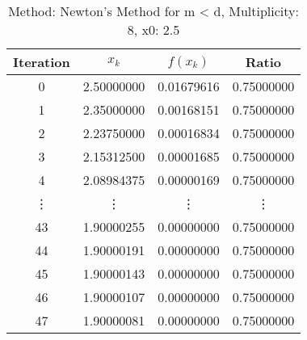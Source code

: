 \begin{table}
\centering
\caption{Method: Newton's Method for m < d, Multiplicity: 8, x0: 2.5}
\label{tab:table_Newton's_Method_for_m_<_d_8_2_5}
\begin{tabular}{c c c c}
\toprule
Iteration &      $x_k$ &   $f(x_k)$ &      Ratio \\
\midrule
        0 & 2.50000000 & 0.01679616 & 0.75000000 \\
        1 & 2.35000000 & 0.00168151 & 0.75000000 \\
        2 & 2.23750000 & 0.00016834 & 0.75000000 \\
        3 & 2.15312500 & 0.00001685 & 0.75000000 \\
        4 & 2.08984375 & 0.00000169 & 0.75000000 \\
   \vdots &     \vdots &     \vdots &     \vdots \\
       43 & 1.90000255 & 0.00000000 & 0.75000000 \\
       44 & 1.90000191 & 0.00000000 & 0.75000000 \\
       45 & 1.90000143 & 0.00000000 & 0.75000000 \\
       46 & 1.90000107 & 0.00000000 & 0.75000000 \\
       47 & 1.90000081 & 0.00000000 & 0.75000000 \\
\bottomrule
\end{tabular}
\end{table}
